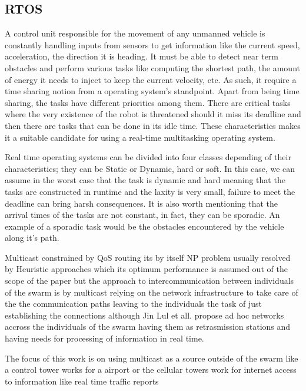 \documentclass[journal]{IEEEtran}
\begin{document}
\subsection{RTOS}
A control unit responsible for the movement of any unmanned vehicle is constantly handling inputs from sensors to get information like the current speed, acceleration, the direction it is heading. It must be able to detect near term obstacles and perform various tasks like computing the shortest path, the amount of energy it needs to inject to keep the current velocity, etc. As such, it require a time sharing notion from a operating system's standpoint. Apart from being time sharing, the tasks have different priorities among them. There are critical tasks where the very existence of the robot is threatened should it miss its deadline and then there are tasks that can be done in its idle time. These characteristics makes it a suitable candidate for using a real-time multitasking operating system.

Real time operating systems can be divided into four classes depending of their characteristics; they can be Static or Dynamic, hard or soft. In this case, we can assume in the worst case that the task is dynamic and hard meaning that the tasks are constructed in runtime and the laxity is very small, failure to meet the deadline can bring harsh consequences. It is also worth mentioning that the arrival times of the tasks are not constant, in fact, they can be sporadic. An example of a sporadic task would be the obstacles encountered by the vehicle along it's path.

Multicast constrained by QoS routing its by itself NP problem usually resolved by Heuristic approaches \cite{HH1} which its optimum performance is assumed out of the scope of the paper but the approach to  intercommunication between individuals of the swarm is by multicast relying on the network infrastructure to take care of the the communication paths leaving to the individuals the task of just establishing the connections although Jin Lul et all. \cite{HH2} propose ad hoc networks accross the individuals of the swarm having them as retrasmission stations and having needs for processing of information in real time.

The focus of this work is on using multicast as a source outside of the swarm like a control tower works for a airport or the cellular towers work for internet access to information like real time traffic reports\cite{YS1}
\end{document}
